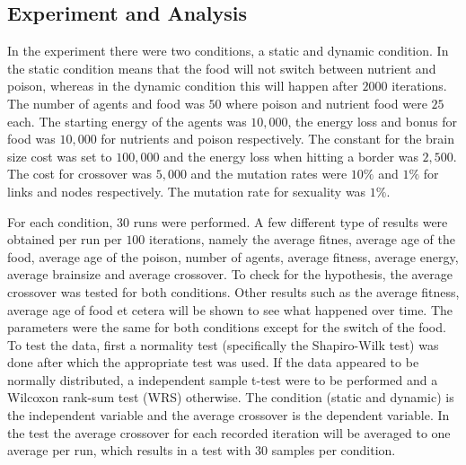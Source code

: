 \subsection{Experiment and Analysis}
In the experiment there were two conditions, a static and dynamic condition.
In the static condition means that the food will not switch between nutrient and poison, whereas in the dynamic condition this will happen after $2000$ iterations.
The number of agents and food was $50$ where poison and nutrient food were $25$ each.
The starting energy of the agents was $10,000$, the energy loss and bonus for food was $10,000$ for nutrients and poison respectively.
The constant for the brain size cost was set to $100,000$ and the energy loss when hitting a border was $2,500$.
The cost for crossover was $5,000$ and the mutation rates were $10\%$ and $1\%$ for links and nodes respectively.
The mutation rate for sexuality was $1\%$.

For each condition, $30$ runs were performed.
A few different type of results were obtained per run per $100$ iterations, namely the average fitnes, average age of the food, average age of the poison, number of agents, average fitness, average energy, average brainsize and average crossover.
To check for the hypothesis, the average crossover was tested for both conditions.
Other results such as the average fitness, average age of food et cetera will be shown to see what happened over time.
The parameters were the same for both conditions except for the switch of the food.
To test the data, first a normality test (specifically the Shapiro-Wilk test) was done after which the appropriate test was used.
If the data appeared to be normally distributed, a independent sample t-test were to be performed and a Wilcoxon rank-sum test (WRS) otherwise.
The condition (static and dynamic) is the independent variable and the average crossover is the dependent variable.
In the test the average crossover for each recorded iteration will be averaged to one average per run, which results in a test with $30$ samples per condition.